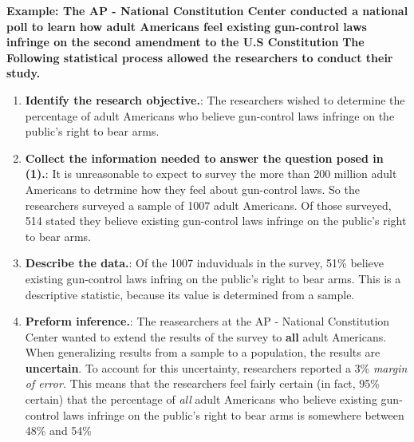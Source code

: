\documentclass{report}
\begin{document}
        \bigbreak \noindent 
        \begin{mdframed}
          \textbf{Example: The AP - National Constitution Center conducted a national poll to learn how adult Americans feel existing gun-control laws infringe on the second amendment to the U.S Constitution}
          \bigbreak \noindent 
          \textbf{The Following statistical process allowed the researchers to conduct their study.}
          \begin{enumerate}
              \item \textbf{Identify the research objective.}: The researchers wished to determine the percentage of adult Americans who believe gun-control laws infringe on the public's right to bear arms.
            \item \textbf{Collect the information needed to answer the question posed in (1).}: It is unreasonable to expect to survey the more than 200 million adult Americans to detrmine how they feel about gun-control laws. So the researchers surveyed a sample of 1007 adult Americans. Of those surveyed, 514 stated they believe existing gun-control laws infringe on the public's right to bear arms.
            \item \textbf{Describe the data.}: Of the 1007 induviduals in the survey, 51\% believe existing gun-control laws infring on the public's right to bear arms. This is a descriptive statistic, because its value is determined from a sample.
            \item \textbf{Preform inference.}: The reasearchers at the AP - National Constitution Center wanted to extend the results of the survey to \textbf{all} adult Americans. When generalizing results from a sample to a population, the results are \textbf{uncertain}. To account for this uncertainty, researchers reported a 3\% \textit{margin of error.} This means that the researchers feel fairly certain (in fact, 95\% certain) that the percentage of \textit{all} adult Americans who believe existing gun-control laws infringe on the public's right to bear arms is somewhere between 48\% and 54\%

          \end{enumerate}
          
        \end{mdframed}
\end{document}
